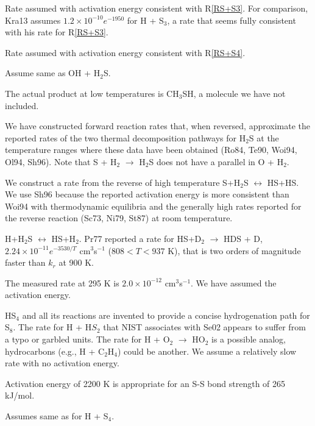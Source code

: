 \documentclass[12pt,landscape]{article}
\newcounter{reaction}
\begin{document}
 Rate assumed with activation energy consistent with R\ref{RS+S3}.
For comparison, Kra13 assumes $1.2\times 10^{-10}e^{-1950}$ for H + S$_3$, a rate that seems fully consistent with his rate for R\ref{RS+S3}.
 
 Rate assumed with activation energy consistent with R\ref{RS+S4}.

 Assume same as OH + H$_2$S.

   The actual product at low temperatures is CH$_3$SH, a molecule we have not included.
 
  We have constructed forward reaction rates that, when reversed, approximate the
reported rates of the two thermal decomposition pathways for H$_2$S at the temperature ranges where these
data have been obtained (Ro84, Te90, Woi94, Ol94, Sh96).  Note that S + H$_2$ $\rightarrow$ H$_2$S does not have a parallel in O + H$_2$.

 We construct a rate from the reverse of high temperature S+H$_2$S $\!\leftrightarrow\!$ HS+HS.
We use Sh96 because the reported activation energy is more consistent than Woi94 with thermodynamic equilibria
and the generally high rates reported for the reverse reaction (Sc73, Ni79, St87) at room temperature.

 H+H$_2$S $\!\leftrightarrow\!$ HS+H$_2$.
Pr77 reported a rate for HS+D$_2$ $\rightarrow$ HDS + D, $2.24\!\times\! 10^{-11} e^{-3530/T}$ cm$^{3}$s$^{-1}$ ($808<T<937$ K), that is two orders of magnitude faster than $k_{r}$ at 900 K.   

 The measured rate at 295 K is $ 2.0\!\times\! 10^{-12}$ cm$^3$s$^{-1}$.  We have assumed the activation energy.

 HS$_4$ and all its reactions are invented to provide a concise hydrogenation path for S$_8$.  The rate for H + H$S_2$ that NIST associates with
Se02 appears to suffer from a typo or garbled units.  The rate for H + O$_2$ $\rightarrow$ HO$_2$ is a possible analog, hydrocarbons (e.g., H + C$_2$H$_4$) could be another.  
We assume a relatively slow rate with no activation energy.  
 
 
  Activation energy of 2200 K is appropriate for an S-S bond strength of 265 kJ/mol.
 
  Assumes same as for H + S$_4$.
 
\end{document}
